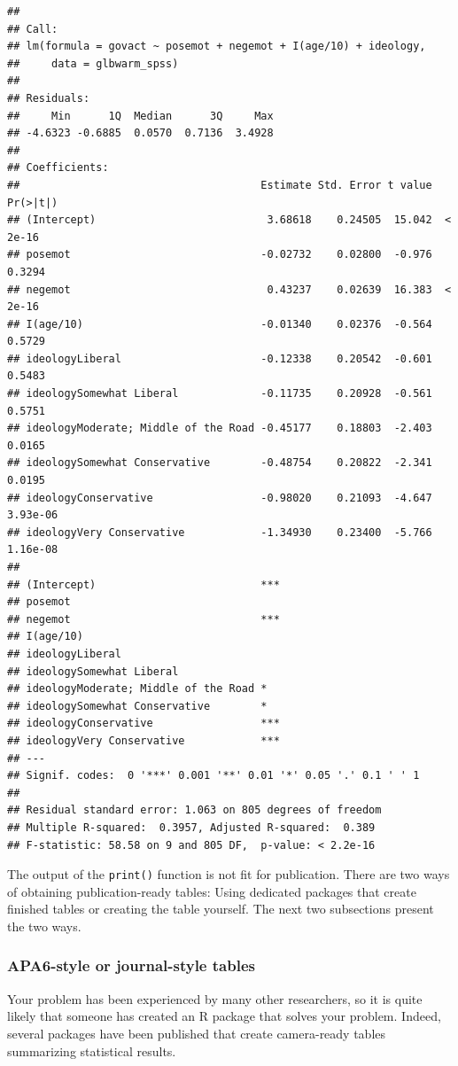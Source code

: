 \documentclass[doc,floatsintext]{apa6}
\begin{document}
\begin{verbatim}
## 
## Call:
## lm(formula = govact ~ posemot + negemot + I(age/10) + ideology, 
##     data = glbwarm_spss)
## 
## Residuals:
##     Min      1Q  Median      3Q     Max 
## -4.6323 -0.6885  0.0570  0.7136  3.4928 
## 
## Coefficients:
##                                      Estimate Std. Error t value Pr(>|t|)
## (Intercept)                           3.68618    0.24505  15.042  < 2e-16
## posemot                              -0.02732    0.02800  -0.976   0.3294
## negemot                               0.43237    0.02639  16.383  < 2e-16
## I(age/10)                            -0.01340    0.02376  -0.564   0.5729
## ideologyLiberal                      -0.12338    0.20542  -0.601   0.5483
## ideologySomewhat Liberal             -0.11735    0.20928  -0.561   0.5751
## ideologyModerate; Middle of the Road -0.45177    0.18803  -2.403   0.0165
## ideologySomewhat Conservative        -0.48754    0.20822  -2.341   0.0195
## ideologyConservative                 -0.98020    0.21093  -4.647 3.93e-06
## ideologyVery Conservative            -1.34930    0.23400  -5.766 1.16e-08
##                                         
## (Intercept)                          ***
## posemot                                 
## negemot                              ***
## I(age/10)                               
## ideologyLiberal                         
## ideologySomewhat Liberal                
## ideologyModerate; Middle of the Road *  
## ideologySomewhat Conservative        *  
## ideologyConservative                 ***
## ideologyVery Conservative            ***
## ---
## Signif. codes:  0 '***' 0.001 '**' 0.01 '*' 0.05 '.' 0.1 ' ' 1
## 
## Residual standard error: 1.063 on 805 degrees of freedom
## Multiple R-squared:  0.3957, Adjusted R-squared:  0.389 
## F-statistic: 58.58 on 9 and 805 DF,  p-value: < 2.2e-16
\end{verbatim}

The output of the \texttt{print()} function is not fit for publication.
There are two ways of obtaining publication-ready tables: Using
dedicated packages that create finished tables or creating the table
yourself. The next two subsections present the two ways.

\subsubsection{APA6-style or journal-style tables}\label{APAtables}

Your problem has been experienced by many other researchers, so it is
quite likely that someone has created an R package that solves your
problem. Indeed, several packages have been published that create
camera-ready tables summarizing statistical results.
\end{document}
